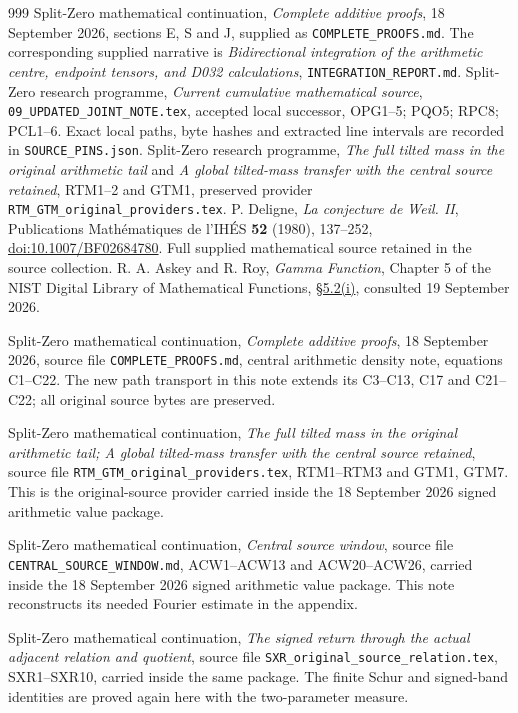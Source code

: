 \documentclass[11pt,a4paper]{article}
\begin{document}
\begin{thebibliography}{999}
Split-Zero mathematical continuation,
\emph{Complete additive proofs}, 18 September 2026,
sections E, S and J, supplied as \texttt{COMPLETE\_PROOFS.md}.
The corresponding supplied narrative is
\emph{Bidirectional integration of the arithmetic centre, endpoint tensors,
and D032 calculations}, \texttt{INTEGRATION\_REPORT.md}.
Split-Zero research programme,
\emph{Current cumulative mathematical source},
\texttt{09\_UPDATED\_JOINT\_NOTE.tex}, accepted local successor,
OPG1--5; PQO5; RPC8; PCL1--6.
Exact local paths, byte hashes and extracted line intervals are
recorded in \texttt{SOURCE\_PINS.json}.
Split-Zero research programme,
\emph{The full tilted mass in the original arithmetic tail}
and \emph{A global tilted-mass transfer with the central source retained},
RTM1--2 and GTM1, preserved provider
\texttt{RTM\_GTM\_original\_providers.tex}.
P. Deligne, \emph{La conjecture de Weil. II},
Publications Math\'ematiques de l'IH\'ES \textbf{52} (1980), 137--252,
\href{https://doi.org/10.1007/BF02684780}{doi:10.1007/BF02684780}.
Full supplied mathematical source retained in the source collection.
R. A. Askey and R. Roy, \emph{Gamma Function}, Chapter 5 of the
NIST Digital Library of Mathematical Functions,
\href{https://dlmf.nist.gov/5.2}{\S5.2(i)}, consulted 19 September 2026.

Split-Zero mathematical continuation,
\emph{Complete additive proofs}, 18 September 2026,
source file \texttt{COMPLETE\_PROOFS.md},
central arithmetic density note, equations C1--C22.
The new path transport in this note extends its C3--C13,
C17 and C21--C22; all original source bytes are preserved.

Split-Zero mathematical continuation,
\emph{The full tilted mass in the original arithmetic tail;
A global tilted-mass transfer with the central source retained},
source file \texttt{RTM\_GTM\_original\_providers.tex},
RTM1--RTM3 and GTM1, GTM7.
This is the original-source provider carried inside the
18 September 2026 signed arithmetic value package.

Split-Zero mathematical continuation,
\emph{Central source window},
source file \texttt{CENTRAL\_SOURCE\_WINDOW.md},
ACW1--ACW13 and ACW20--ACW26,
carried inside the 18 September 2026 signed arithmetic
value package.  This note reconstructs its needed Fourier
estimate in the appendix.

Split-Zero mathematical continuation,
\emph{The signed return through the actual adjacent relation and quotient},
source file \texttt{SXR\_original\_source\_relation.tex},
SXR1--SXR10, carried inside the same package.
The finite Schur and signed-band identities are proved
again here with the two-parameter measure.


\end{thebibliography}
\end{document}
